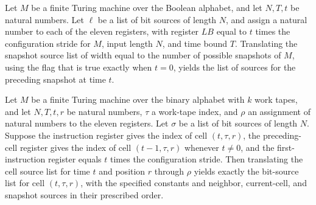 \begin{theorem}
\label{Complexity.UTab.psnS_toBitSrc}
\leanok
{}
Let $M$ be a finite Turing machine over the Boolean alphabet, and let $N,T,t$ be natural
numbers. Let $\ell$ be a list of bit sources of length $N$, and assign a natural number
to each of the eleven registers, with register $LB$ equal to $t$ times the configuration
stride for $M$, input length $N$, and time bound $T$. Translating the snapshot source
list of width equal to the number of possible snapshots of $M$, using the flag that is
true exactly when $t=0$, yields the list of sources for the preceding snapshot at time
$t$.
\end{theorem}

\begin{theorem}
\label{Complexity.UTab.cellS_toBitSrc}
\leanok
{}
Let $M$ be a finite Turing machine over the binary alphabet with $k$ work tapes, and let
$N,T,t,r$ be natural numbers, $\tau$ a work-tape index, and $\rho$ an assignment of
natural numbers to the eleven registers. Let $\sigma$ be a list of bit sources of length $N$.
Suppose the instruction register gives the index of cell $(t,\tau,r)$, the preceding-cell
register gives the index of cell $(t-1,\tau,r)$ whenever $t\ne 0$, and the
first-instruction register equals $t$ times the configuration stride. Then translating
the cell source list for time $t$ and position $r$ through $\rho$ yields exactly the
bit-source list for cell $(t,\tau,r)$, with the specified constants and neighbor,
current-cell, and snapshot sources in their prescribed order.
\end{theorem}

